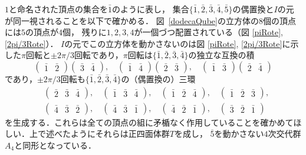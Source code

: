 $1$と命名された頂点の集合を$\bar 1$のように表し，
集合$\{\bar 1, \bar 2 ,\bar 3 ,\bar 4, \bar 5\}$の偶置換と$I$の元が同一視されることを以下で確かめる．
図~\ref{dodecaQube}の立方体の$8$個の頂点には$5$の頂点が$4$個，
残りに$1, 2, 3, 4$が一個づつ配置されている（図 \ref{piRote}, \ref{2pi/3Rote}）．
$I$の元でこの立方体を動かさないのは図 \ref{piRote}, \ref{2pi/3Rote}に示した$\pi$回転と$\pm2\pi/3$回転であり，$\pi$回転は$\{\bar 1, \bar 2 ,\bar 3 ,\bar 4\}$の独立な互換の積
\[
     \begin{pmatrix}\bar 1&\bar 2\end{pmatrix}
     \begin{pmatrix}\bar 3&\bar 4\end{pmatrix},\quad
     \begin{pmatrix}\bar 1&\bar 4\end{pmatrix}
     \begin{pmatrix}\bar 2&\bar 3\end{pmatrix},\quad
     \begin{pmatrix}\bar 1&\bar 3\end{pmatrix}
     \begin{pmatrix}\bar 2&\bar 4\end{pmatrix}
\]
であり，$\pm 2\pi/3$回転も$\{\bar 1, \bar 2 ,\bar 3 ,\bar 4\}$の（偶置換の）三環
\[
\begin{split}
     &\begin{pmatrix}\bar 2&\bar 3& \bar 4\end{pmatrix},\quad
     \begin{pmatrix}\bar 1&\bar 3& \bar 4\end{pmatrix},\quad
     \begin{pmatrix}\bar 1&\bar 2& \bar 4\end{pmatrix},\quad
     \begin{pmatrix}\bar 1&\bar 2& \bar 3\end{pmatrix},\\
     &\begin{pmatrix}\bar 4&\bar 3& \bar 2\end{pmatrix},\quad
     \begin{pmatrix}\bar 4&\bar 3& \bar 1\end{pmatrix},\quad
     \begin{pmatrix}\bar 4&\bar 2& \bar 1\end{pmatrix},\quad
     \begin{pmatrix}\bar 3&\bar 2& \bar 1\end{pmatrix}
\end{split}
\]
を生成する．これらは全ての頂点の組に矛楯なく作用していることを確かめてほしい．上で述べたようにそれらは正四面体群$T$を成し，
$\bar 5$を動かさない$4$次交代群$A_4$と同形となっている．


